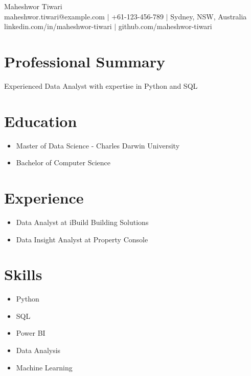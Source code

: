 \documentclass[11pt,a4paper]{article}
\begin{document}
\begin{center}
    Maheshwor Tiwari \\
    maheshwor.tiwari@example.com $|$ +61-123-456-789 $|$ Sydney, NSW, Australia \\
    linkedin.com/in/maheshwor-tiwari $|$ github.com/maheshwor-tiwari
\end{center}
\vspace{0.5em}
\section*{Professional Summary}
Experienced Data Analyst with expertise in Python and SQL
\section*{Education}
\begin{itemize}[leftmargin=*]
  
    \item Master of Data Science - Charles Darwin University
  
    \item Bachelor of Computer Science

\end{itemize}
\section*{Experience}
\begin{itemize}[leftmargin=*]
  
    \item Data Analyst at iBuild Building Solutions
  
    \item Data Insight Analyst at Property Console

\end{itemize}
\section*{Skills}
\begin{itemize}[leftmargin=*]
  
    \item Python
  
    \item SQL
  
    \item Power BI
  
    \item Data Analysis
  
    \item Machine Learning

\end{itemize}
\end{document}

